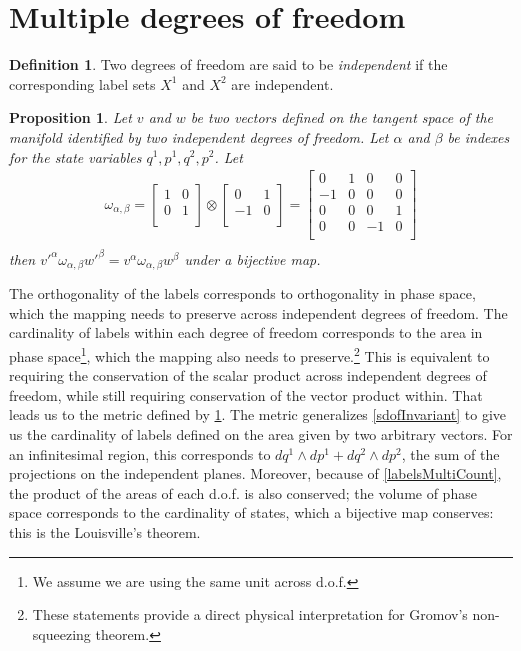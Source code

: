 \documentclass[twocolumn,floatfix,nofootinbib]{revtex4}   %
\theoremstyle{theorem}
\newtheorem{prop}[thm]{Proposition}
\theoremstyle{definition}
\newtheorem{defn}[thm]{Definition}
\begin{document}
\section{Multiple degrees of freedom}

\begin{defn}\label{mdof}
Two degrees of freedom are said to be \emph{independent} if the corresponding label sets $X^1$ and $X^2$ are independent.
\end{defn}

\begin{prop}\label{mdofInvariant}
Let $v$ and $w$ be two vectors defined on the tangent space of the manifold identified by two independent degrees of freedom. Let $\alpha$ and $\beta$ be indexes for the state variables $q^1, p^1, q^2, p^2$. Let
\begin{align*}
\omega_{\alpha, \beta} =  \left[
  \begin{array}{cc}
    1 & 0 \\
    0 & 1 \\
  \end{array}
\right] \otimes \left[
  \begin{array}{cc}
    0 & 1 \\
    -1 & 0 \\
  \end{array}
\right] =
\left[
  \begin{array}{cccc}
    0 & 1 & 0 & 0 \\
    -1 & 0 & 0 & 0 \\
    0 & 0 & 0 & 1 \\
    0 & 0 & -1 & 0 \\
  \end{array}
\right] \\
\end{align*}
then $v'^{\alpha} \omega_{\alpha, \beta} w'^{\beta}=v^{\alpha} \omega_{\alpha, \beta} w^{\beta}$ under a bijective map.
\end{prop}

The orthogonality of the labels corresponds to orthogonality in phase space, which the mapping needs to preserve across independent degrees of freedom. The cardinality of labels within each degree of freedom corresponds to the area in phase space\footnote{We assume we are using the same unit across d.o.f.}, which the mapping also needs to preserve.\footnote{These statements provide a direct physical interpretation for Gromov's non-squeezing theorem\cite{Gromov,deGosson,Stewart}.} This is equivalent to requiring the conservation of the scalar product across independent degrees of freedom, while still requiring conservation of the vector product within. That leads us to the metric defined by \ref{mdofInvariant}.
The metric generalizes \ref{sdofInvariant} to give us the cardinality of labels defined on the area given by two arbitrary vectors. For an infinitesimal region, this corresponds to $dq^1 \wedge dp^1 + dq^2 \wedge dp^2$, the sum of the projections on the independent planes. Moreover, because of \ref{labelsMultiCount}, the product of the areas of each d.o.f. is also conserved; the volume of phase space corresponds to the cardinality of states, which a bijective map conserves: this is the Louisville's theorem.
\end{document}
